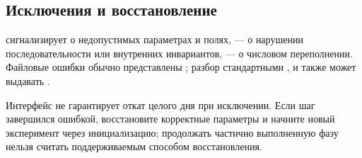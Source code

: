 \subsection{Исключения и восстановление}
 сигнализирует о недопустимых параметрах и полях,
 --- о нарушении последовательности или внутренних
инвариантов,  --- о числовом переполнении.
Файловые ошибки обычно представлены ; разбор
стандартными ,  и  также может выдавать
.

Интерфейс не гарантирует откат целого дня при исключении. Если шаг завершился
ошибкой, восстановите корректные параметры и начните новый эксперимент
через инициализацию; продолжать частично выполненную фазу нельзя считать
поддерживаемым способом восстановления.
